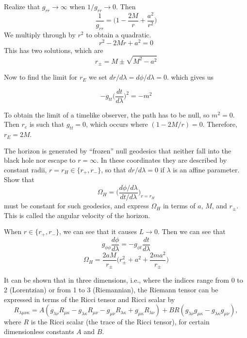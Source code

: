 \documentclass[11pt,largemargins]{homework}
\begin{document}
\begin{alphaparts}
Realize that $g_{rr} \to \infty$ when $1/g_{rr} \to 0$.  Then
$$\frac{1}{g_{rr}} = \Big(1 - \frac{2M}{r} + \frac{a^2}{r^2} \Big)$$  We multiply through by $r^2$ to obtain a quadratic.
$$ r^2 - 2Mr + a^2 = 0$$  This has two solutions, which are
$$ r_{\pm} = M \pm \sqrt{M^2 - a^2} $$ 

Now to find the limit for $r_E$ we set $dr/d\lambda = d\phi / d\lambda = 0$. which gives us

$$ -g_{tt} \Big(\frac{dt}{d\lambda}\Big)^2 = -m^2 $$

To obtain the limit of a timelike observer, the path has to be null, so $m^2 = 0$. Then $r_e$ is such that $g_{tt} = 0$, which occurs where $(1 - 2M/r) = 0$.  Therefore, $r_E = 2M$. 

\questionpart 
The horizon is generated by ``frozen'' null geodesics that neither fall into the black hole nor escape to $r = \infty$.  In these coordinates they are described by constant radii, $r = r_H \in \{r_+, r_-\}$, so that $dr / d\lambda = 0$ if $\lambda$ is an affine parameter.  Show that 
$$ \Omega_H = \Big(\frac{d\phi/d\lambda}{dt/d\lambda} \Big)_{r=r_H} $$ must be constant for such geodesics, and express $\Omega_H$ in terms of $a$, $M$, and $r_\pm$.  This is called the angular velocity of the horizon. 

When $r \in \{r_+, r_-\}$, we can see that it causes $L \to 0$.  Then we can see that 
$$ g_{\phi \phi} \frac{d\phi}{d\lambda} = -g_{\phi t} \frac{dt}{d\lambda} $$
$$ \Omega_H = \frac{2aM}{r_\pm} \Big(r_{\pm}^2 + a^2 + \frac{2ma^2}{r_{\pm}} \Big) $$
\end{alphaparts}


\question
It can be shown that in three dimensions, i.e., where the indices range from 0 to 2 (Lorentzian) or from 1 to 3 (Riemannian), the Riemann tensor can be expressed in terms of the Ricci tensor and Ricci scalar by 
\begin{equation}
R_{\lambda \mu \nu \kappa} = A(g_{\lambda \nu}R_{\mu \kappa} - g_{\lambda \kappa}R_{\mu \nu} - g_{\mu \nu}R_{\lambda \kappa} + g_{\mu \kappa} R_{\lambda \nu}) + BR(g_{\lambda \nu} g_{\mu \kappa} - g_{\lambda \kappa} g_{\mu \nu}),  
\end{equation}
where $R$ is the Ricci scalar (the trace of the Ricci tensor), for certain dimensionless constants $A$ and $B$.
\end{document}
